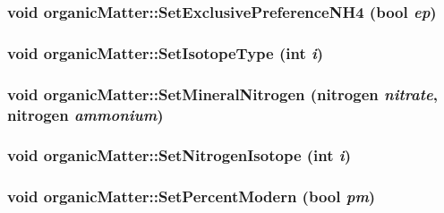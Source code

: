 \label{classorganic_matter_a3dd11964f9c983b37c88328c80a978c1}
\hypertarget{classorganic_matter_a2ca7d6028136a0f472893028928ca8a1}{
\subsubsection[{SetExclusivePreferenceNH4}]{\setlength{\rightskip}{0pt plus 5cm}void organicMatter::SetExclusivePreferenceNH4 (bool {\em ep})}}
\label{classorganic_matter_a2ca7d6028136a0f472893028928ca8a1}
\hypertarget{classorganic_matter_a471fa39b7f79ccae2ae020e5b9c1329f}{
\subsubsection[{SetIsotopeType}]{\setlength{\rightskip}{0pt plus 5cm}void organicMatter::SetIsotopeType (int {\em i})}}
\label{classorganic_matter_a471fa39b7f79ccae2ae020e5b9c1329f}
\hypertarget{classorganic_matter_ab31c08dc89717cfc1d1e212c4076ff3c}{
\subsubsection[{SetMineralNitrogen}]{\setlength{\rightskip}{0pt plus 5cm}void organicMatter::SetMineralNitrogen ({\bf nitrogen} {\em nitrate}, \/  {\bf nitrogen} {\em ammonium})}}
\label{classorganic_matter_ab31c08dc89717cfc1d1e212c4076ff3c}
\hypertarget{classorganic_matter_ad1d3b959079c019aee2164c8e32791ed}{
\subsubsection[{SetNitrogenIsotope}]{\setlength{\rightskip}{0pt plus 5cm}void organicMatter::SetNitrogenIsotope (int {\em i})}}
\label{classorganic_matter_ad1d3b959079c019aee2164c8e32791ed}
\hypertarget{classorganic_matter_ad506c445be08af7d10c7173f2ea5fe9c}{
\subsubsection[{SetPercentModern}]{\setlength{\rightskip}{0pt plus 5cm}void organicMatter::SetPercentModern (bool {\em pm})}}
